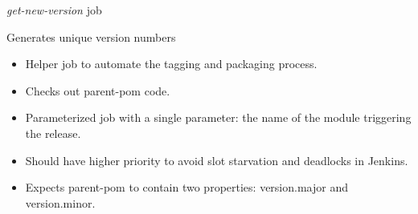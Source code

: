 \documentclass[presentation,c]{beamer}
\begin{document}
{
\begin{frame}[label=sec-7-2]{\textit{get-new-version} job}

\begin{block}{Generates unique version numbers}

\begin{itemize}
\item Helper job to automate the tagging and packaging process.
\item Checks out parent-pom code.
\item Parameterized job with a single parameter: the name of the module triggering the release.
\item Should have higher priority to avoid slot starvation and deadlocks in Jenkins.
\item Expects parent-pom to contain two properties: version.major and version.minor.
\end{itemize}
\end{block}
\end{frame}
} %

{
\begin{frame}[label=sec-7-3]{}

\begin{columns}
\begin{column}{0.6\textwidth}
\begin{quotation} %

\end{quotation}
\end{column}
\end{columns}
\end{frame}
} %
\end{document}
